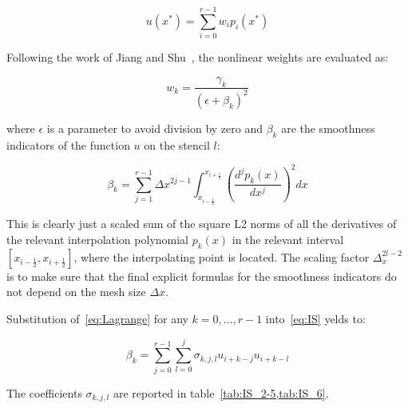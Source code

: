 \begin{equation}
  \label{eq:WENO_interp}
  u(x^*) = \sum_{i=0}^{r-1} w_i p_i(x^*)
\end{equation}

Following the work of Jiang and Shu~\cite{jiang-1996}, the nonlinear weights are evaluated as:

\begin{equation}
  \label{eq:nonlinear_weights}
  w_k = \frac{\gamma_k}{\left( \epsilon + \beta_k \right)^2}
\end{equation}

where $\epsilon$ is a parameter to avoid division by zero and $\beta_k$ are the smoothness indicators of the function $u$ on the stencil $l$:

\begin{equation}
  \label{eq:IS}
  \beta_k = \sum_{j=1}^{r-1} \Delta x^{2j-1} \int_{x_{i-\frac{1}{2}}}^{x_{i+\frac{1}{2}}} \left( \frac{d^j p_k(x)}{dx^j} \right)^2 dx
\end{equation}

This is clearly just a scaled sum of the square L2 norms of all the derivatives of the relevant interpolation polynomial $p_k(x)$ in the relevant interval $[x_{i−\frac{1}{2}},x_{i+\frac{1}{2}}]$, where the interpolating point is located. The scaling factor $\Delta_x^{2l-2}$ is to make sure that the final explicit formulas for the smoothness indicators do not depend on the mesh size $\Delta x$.

Substitution of~\eqref{eq:Lagrange} for any $k=0,\dots,r-1$ into~\eqref{eq:IS} yelds to:

\begin{equation}
  \label{eq:IS_u}
  \beta_k = \sum_{j=0}^{r-1} \sum_{l=0}^j \sigma_{k,j,l} u_{i+k-j} u_{i+k-l}
\end{equation}

The coefficients $\sigma_{k,j,l}$ are reported in table~\cref{tab:IS_2-5,tab:IS_6}.

